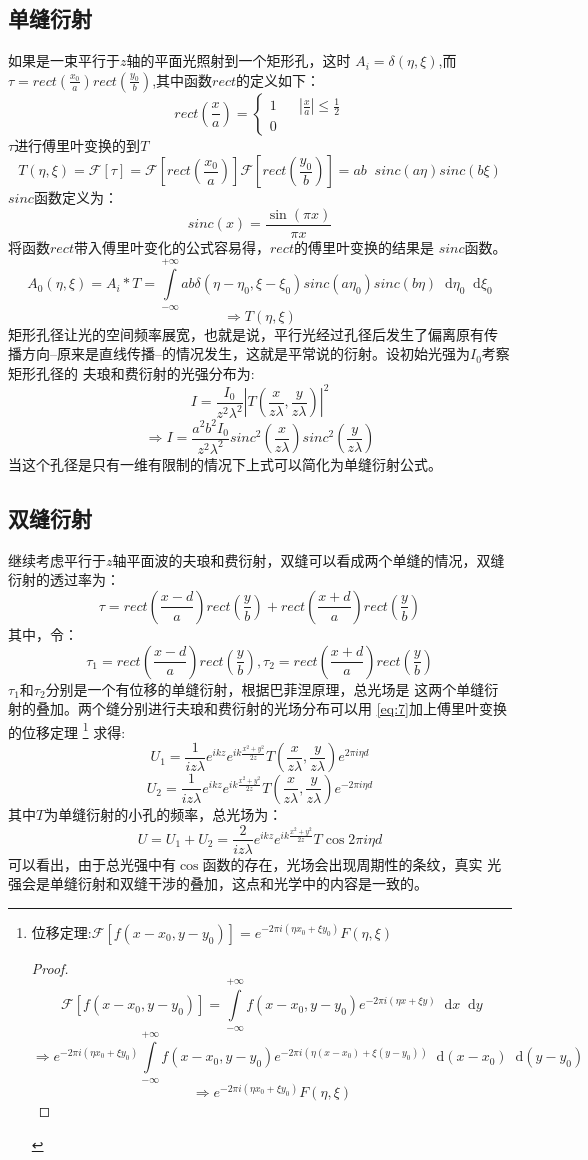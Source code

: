 \documentclass{article}
\newcommand*{\dif}{\mathop{}\!\mathrm{d}}
\begin{document}
\subsection{单缝衍射}
如果是一束平行于$z$轴的平面光照射到一个矩形孔，这时
$A_i=\delta(\eta,\xi)$,而
$\tau=rect(\frac{x_0}{a})rect(\frac{y_0}{b})$,其中函数$rect$的定义如下：
\[
  rect(\frac{x}{a})=\left \{
    \begin{array}{rcl}
      1 && |\frac{x}{a}|\leq \frac{1}{2}\\
      0 && {}
    \end{array}
  \right
  .
\]
$\tau$进行傅里叶变换的到$T$
\[T(\eta,\xi)=\mathscr{F}[\tau]=\mathscr{F}[rect(\frac{x_0}{a})]\mathscr{F}[rect(\frac{y_0}{b})]=ab\mathop{}\!sinc(a\eta)sinc(b\xi)\]
$sinc$函数定义为：
\[sinc(x)=\frac{\sin(\pi x)}{\pi x}\]
将函数$rect$带入傅里叶变化的公式容易得，$rect$的傅里叶变换的结果是
$sinc$函数。
\[A_0(\eta,\xi)=A_i*T=\int\limits_{-\infty}^{+\infty}ab\delta(\eta-\eta_0,\xi-\xi_0)sinc(a\eta_0)sinc(b\eta)\dif\eta_0\dif\xi_0\]
\[\Rightarrow T(\eta,\xi)\]
矩形孔径让光的空间频率展宽，也就是说，平行光经过孔径后发生了偏离原有传
播方向--原来是直线传播--的情况发生，这就是平常说的衍射。设初始光强为$I_0$考察矩形孔径的
夫琅和费衍射的光强分布为:
\[I=\frac{I_0}{z^2\lambda^2}|T(\frac{x}{z\lambda},\frac{y}{z\lambda})|^2\]
\[\Rightarrow I=\frac{a^2b^2I_0}{z^2\lambda^2}sinc^2(\frac{x}{z\lambda})sinc^2(\frac{y}{z\lambda})\]
当这个孔径是只有一维有限制的情况下上式可以简化为单缝衍射公式。
\subsection{双缝衍射}
继续考虑平行于$z$轴平面波的夫琅和费衍射，双缝可以看成两个单缝的情况，双缝衍射的透过率为：
\[\tau=rect(\frac{x-d}{a})rect(\frac{y}{b})+rect(\frac{x+d}{a})rect(\frac{y}{b})\]
其中，令：
\[\tau_1=rect(\frac{x-d}{a})rect(\frac{y}{b}),\tau_2=rect(\frac{x+d}{a})rect(\frac{y}{b})\]
$\tau_1$和$\tau_2$分别是一个有位移的单缝衍射，根据巴菲涅原理，总光场是
这两个单缝衍射的叠加。两个缝分别进行夫琅和费衍射的光场分布可以用
\ref{eq:7}加上傅里叶变换的位移定理
\footnote{
  位移定理:$\mathscr{F}[f(x-x_0,y-y_0)]=e^{-2\pi i(\eta x_0+\xi
    y_0)}F(\eta,\xi)$
  \begin{proof}
    \[\mathscr{F}[f(x-x_0,y-y_0)]=\int\limits_{-\infty}^{+\infty}f(x-x_0,y-y_0)e^{-2\pi
        i(\eta x+\xi y)}\dif x\dif y\]
    \[\Rightarrow e^{-2\pi i(\eta x_0+\xi
        y_0)}\int\limits_{-\infty}^{+\infty}f(x-x_0,y-y_0)e^{-2\pi i(\eta
        (x-x_0)+\xi(y-y_0))}\dif(x-x_0)\dif(y-y_0)\]
    \[\Rightarrow e^{-2\pi i(\eta x_0+\xi y_0)}F(\eta,\xi)\]
  \end{proof}

}
求得:
\[U_1=\frac{1}{iz\lambda}e^{ikz}e^{ik
    \frac{x^2+y^2}{2z}}T(\frac{x}{z\lambda},\frac{y}{z\lambda})e^{2\pi
    i\eta d}\]
\[U_2=\frac{1}{iz\lambda}e^{ikz}e^{ik
    \frac{x^2+y^2}{2z}}T(\frac{x}{z\lambda},\frac{y}{z\lambda})e^{-2\pi
    i\eta d}\]
其中$T$为单缝衍射的小孔的频率，总光场为：
\[U=U_1+U_2=\frac{2}{iz\lambda}e^{ikz}e^{ik
    \frac{x^2+y^2}{2z}}T\cos{2\pi i\eta d}\]
可以看出，由于总光强中有$\cos$函数的存在，光场会出现周期性的条纹，真实
光强会是单缝衍射和双缝干涉的叠加，这点和光学中的内容是一致的。
\end{document}
